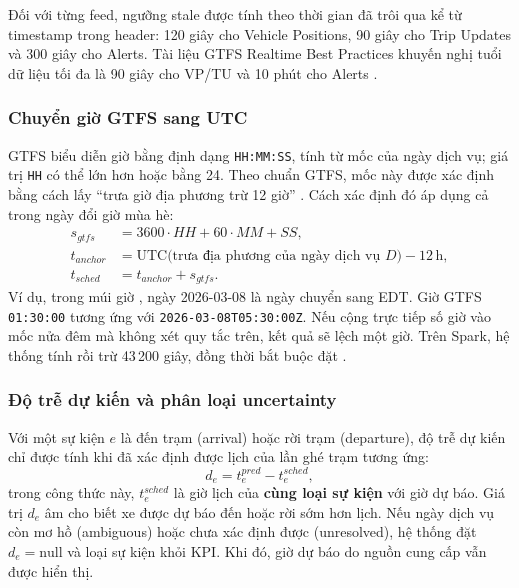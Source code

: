 Đối với từng feed, ngưỡng stale được tính theo thời gian đã trôi qua kể từ timestamp trong header: 120 giây cho Vehicle Positions, 90 giây cho Trip Updates và 300 giây cho Alerts. Tài liệu GTFS Realtime Best Practices khuyến nghị tuổi dữ liệu tối đa là 90 giây cho VP/TU và 10 phút cho Alerts \cite{gtfs_rt_bp}.

\subsubsection{Chuyển giờ GTFS sang UTC}

GTFS biểu diễn giờ bằng định dạng \texttt{HH:MM:SS}, tính từ mốc của ngày dịch vụ; giá trị \texttt{HH} có thể lớn hơn hoặc bằng 24. Theo chuẩn GTFS, mốc này được xác định bằng cách lấy ``trưa giờ địa phương trừ 12 giờ'' \cite{gtfs_static}. Cách xác định đó áp dụng cả trong ngày đổi giờ mùa hè:
\begin{align}
s_{gtfs} &= 3600\cdot HH + 60\cdot MM + SS, \\
t_{anchor} &= \text{UTC}\big(\text{trưa địa phương của ngày dịch vụ } D\big) - 12\,\text{h}, \\
t_{sched} &= t_{anchor} + s_{gtfs}.
\end{align}
Ví dụ, trong múi giờ , ngày 2026-03-08 là ngày chuyển sang EDT. Giờ GTFS \texttt{01:30:00} tương ứng với \texttt{2026-03-08T05:30:00Z}. Nếu cộng trực tiếp số giờ vào mốc nửa đêm mà không xét quy tắc trên, kết quả sẽ lệch một giờ. Trên Spark, hệ thống tính  rồi trừ 43\,200 giây, đồng thời bắt buộc đặt .

\subsubsection{Độ trễ dự kiến và phân loại uncertainty}

Với một sự kiện $e$ là đến trạm (arrival) hoặc rời trạm (departure), độ trễ dự kiến chỉ được tính khi đã xác định được lịch của lần ghé trạm tương ứng:
\begin{equation}
d_e = t^{pred}_e - t^{sched}_e,
\end{equation}
trong công thức này, $t^{sched}_e$ là giờ lịch của \textbf{cùng loại sự kiện} với giờ dự báo. Giá trị $d_e$ âm cho biết xe được dự báo đến hoặc rời sớm hơn lịch. Nếu ngày dịch vụ còn mơ hồ (ambiguous) hoặc chưa xác định được (unresolved), hệ thống đặt $d_e = \text{null}$ và loại sự kiện khỏi KPI. Khi đó, giờ dự báo do nguồn cung cấp vẫn được hiển thị.

